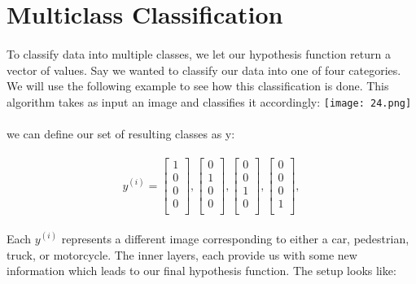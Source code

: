 \documentclass[UTF8]{ctexart}
\begin{document}
\section{Multiclass Classification}
\paragraph{}
To classify data into multiple classes, we let our hypothesis function return a vector of values. Say we wanted to classify our data into one of four categories. We will use the following example to see how this classification is done. This algorithm takes as input an image and classifies it accordingly:
\texttt{[image: 24.png]}
\paragraph{}
we can define our set of resulting classes as y:
\paragraph{}
\begin{algorithm}
\begin{equation}
y^{(i)}=\left[\begin{array}{c}
1\\
0\\
0\\
0\\
\end{array}\right],\left[\begin{array}{c}
0\\
1\\
0\\
0\\
\end{array}\right],\left[\begin{array}{c}
0\\
0\\
1\\
0\\
\end{array}\right],\left[\begin{array}{c}
0\\
0\\
0\\
1\\
\end{array}\right],
\end{equation}
\end{algorithm}
\paragraph{}
Each $y^{(i)}$ represents a different image corresponding to either a car, pedestrian, truck, or motorcycle. The inner layers, each provide us with some new information which leads to our final hypothesis function. The setup looks like:
\end{document}
